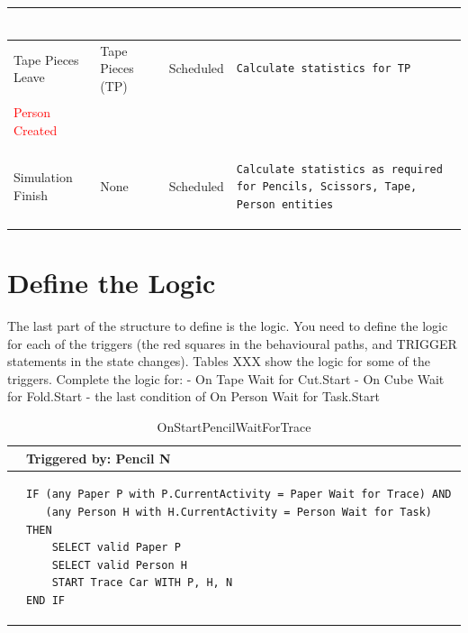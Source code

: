 \documentclass[
  10pt,
  a4paperpaper,
  DIV=11,
  numbers=noendperiod,
  oneside]{scrreprt}
\begin{document}
\begin{longtable}{@{}>{\raggedright\arraybackslash}p{1.5cm}>{\raggedright\arraybackslash}p{2.1cm}>{\raggedright\arraybackslash}p{2.2cm}>{\raggedright\arraybackslash}p{10cm}@{}}
\begin{lstlisting}[language=CMPseudo]
  \end{lstlisting}
  \\ \midrule
Tape Pieces Leave & Tape Pieces (TP)  & Scheduled  & 
  \begin{lstlisting}[language=CMPseudo]
Calculate statistics for TP
  \end{lstlisting}
  \\ \midrule
  \textcolor{Red}{Person Created} &  &   & 
  \begin{lstlisting}[language=CMPseudo]
 
  \end{lstlisting}
  \\ \midrule
  Simulation Finish & None  & Scheduled  & 
  \begin{lstlisting}[language=CMPseudo]
Calculate statistics as required for Pencils, Scissors, Tape, Person entities
  \end{lstlisting}
  \\ \bottomrule
  

\end{longtable}

\section{Define the Logic}\label{define-the-logic-1}

The last part of the structure to define is the logic. You need to
define the logic for each of the triggers (the red squares in the
behavioural paths, and TRIGGER statements in the state changes). Tables
XXX show the logic for some of the triggers. Complete the logic for: -
On Tape Wait for Cut.Start - On Cube Wait for Fold.Start - the last
condition of On Person Wait for Task.Start

\begin{longtable}{@{}>{\raggedright\arraybackslash}p{0.25cm}>{\raggedright\arraybackslash}p{13cm}@{}}

\caption{\label{tbl-start_wait_check_in}OnStartPencilWaitForTrace}

\tabularnewline

  \toprule
   & Triggered by: Pencil N\\ \midrule 
  &
\begin{lstlisting}[language=CMPseudo]
IF (any Paper P with P.CurrentActivity = Paper Wait for Trace) AND
   (any Person H with H.CurrentActivity = Person Wait for Task) THEN
    SELECT valid Paper P
    SELECT valid Person H
    START Trace Car WITH P, H, N
END IF
\end{lstlisting}
  \\ \bottomrule
  

\end{longtable}
\end{document}
